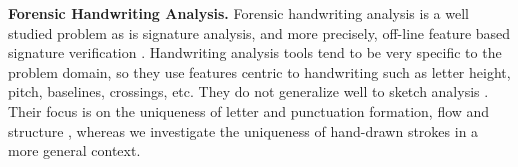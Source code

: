 \noindent\textbf{Forensic Handwriting Analysis.}
Forensic handwriting analysis is a well studied problem \cite{srisurvey03} as is signature analysis, and more precisely, off-line feature based signature verification \cite{4603099,Kovari2013247}. Handwriting analysis tools tend to be very specific to the problem domain, so they use features centric to handwriting such as letter height, pitch, baselines, crossings, etc. They do not generalize well to sketch analysis \cite{1263248}. Their focus is on the uniqueness of letter and punctuation formation, flow and structure \cite{handwriting2001}, whereas we investigate the uniqueness of hand-drawn strokes in a more general context.


